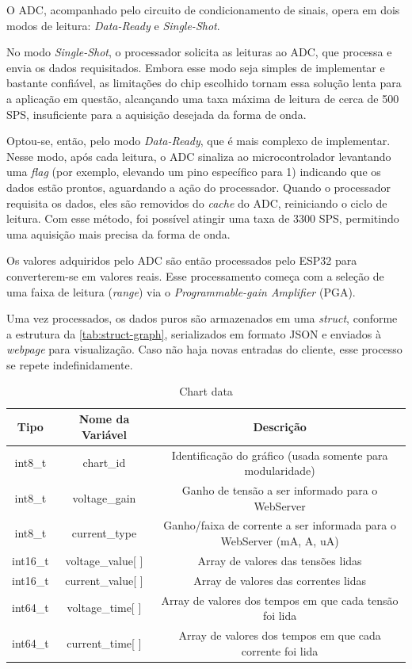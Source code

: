 O \gls{ADC}, acompanhado pelo circuito de condicionamento de sinais, opera em dois modos de leitura: \textit{Data-Ready} e \textit{Single-Shot}.

No modo \textit{Single-Shot}, o processador solicita as leituras ao \gls{ADC}, que processa e envia os dados requisitados. Embora esse modo seja simples de implementar e bastante confiável, as limitações do chip escolhido tornam essa solução lenta para a aplicação em questão, alcançando uma taxa máxima de leitura de cerca de 500 \gls{SPS}, insuficiente para a aquisição desejada da forma de onda.

Optou-se, então, pelo modo \textit{Data-Ready}, que é mais complexo de implementar. Nesse modo, após cada leitura, o \gls{ADC} sinaliza ao microcontrolador levantando uma \textit{flag} (por exemplo, elevando um pino específico para 1) indicando que os dados estão prontos, aguardando a ação do processador. Quando o processador requisita os dados, eles são removidos do \textit{cache} do \gls{ADC}, reiniciando o ciclo de leitura. Com esse método, foi possível atingir uma taxa de 3300 \gls{SPS}, permitindo uma aquisição mais precisa da forma de onda.

Os valores adquiridos pelo \gls{ADC} são então processados pelo ESP32 para converterem-se em valores reais. Esse processamento começa com a seleção de uma faixa de leitura (\textit{range}) via o \textit{Programmable-gain Amplifier} (\gls{PGA}).

Uma vez processados, os dados puros são armazenados em uma \textit{struct}, conforme a estrutura da \autoref{tab:struct-graph}, serializados em formato JSON e enviados à \textit{webpage} para visualização. Caso não haja novas entradas do cliente, esse processo se repete indefinidamente.

\begin{table}[h!]
\centering
\caption{Chart data}
\begin{tabular}{|c|c|c|}
    \hline
    \textbf{Tipo} & \textbf{Nome da Variável} & \textbf{Descrição} \\ \hline
    int8\_t & chart\_id & Identificação do gráfico (usada somente para modularidade) \\ \hline
    int8\_t & voltage\_gain & Ganho de tensão a ser informado para o WebServer \\ \hline
    int8\_t & current\_type & Ganho/faixa de corrente a ser informada para o WebServer (mA, A, uA) \\ \hline
    int16\_t & voltage\_value[ ] & Array de valores das tensões lidas \\ \hline
    int16\_t & current\_value[ ] & Array de valores das correntes lidas \\ \hline
    int64\_t & voltage\_time[ ] & Array de valores dos tempos em que cada tensão foi lida \\ \hline
    int64\_t & current\_time[ ] & Array de valores dos tempos em que cada corrente foi lida \\ \hline
\end{tabular}
\label{tab:struct-graph}
\end{table}

